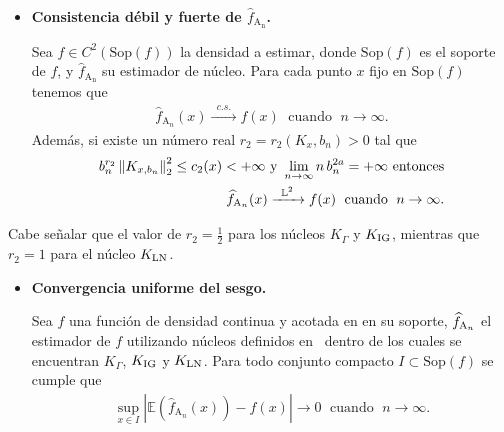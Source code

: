 \begin{itemize}
	\item \textbf{Consistencia débil y fuerte de $\widehat{f}_{\text{A}_\text{n}}$.} 
	\begin{theorem}
		Sea $f \in C^2(\mathrm{Sop}(f))$ la densidad a estimar, donde $\mathrm{Sop}(f)$ es el soporte de $f$, y $\widehat{f}_{\text{A}_\text{n}}$ su estimador de núcleo. Para cada punto $x$ fijo en $\mathrm{Sop}(f)$ tenemos que
		\begin{align}
		\widehat{f}_{\text{A}_n}(x) \xrightarrow{\;\; c.s. \;\; }f(x) \; \text{ cuando } \; n \rightarrow \infty.
		\label{Consistenciac.s.} 
		\end{align}	
		Además, si existe un número real $r_2=r_2(K_x,b_n)>0$ tal que 
		\begin{align}
		b_n^{r_2}\left\lVert K_{x,b_n}\right\rVert_2^2 \leq c_2(x)<+\infty \text{ y } \lim\limits_{n \rightarrow \infty} n \, b_n^{2a}=+\infty \text{ entonces}\\
		\centering \widehat{f}_{\text{A}_n}(x) \xrightarrow{\;\; \mathbb{L}^2 \;\; }f(x) \; \text{ cuando } \; n \rightarrow \infty.
		\label{ConsistenciaL2} 
		\end{align}	
\end{theorem}
\end{itemize}

Cabe señalar que el valor de $r_2=\frac{1}{2}$ para los núcleos $K_{\Gamma}$ y $K_{\tiny \text{IG}}$, mientras que $r_2=1$ para el núcleo $K_{\tiny \text{LN}}$.

\begin{itemize}
	\item \textbf{Convergencia uniforme del sesgo.} 
	\begin{theorem}
		Sea $f$ una función de densidad continua y acotada en en su soporte, $\widehat{f}_{\tiny \text{A}_n}$ el estimador de $f$ utilizando núcleos definidos en~\cite{Libnegue2013} dentro de los cuales se encuentran $K_{\Gamma}$, $K_{\tiny \text{IG}}$ y $K_{\tiny \text{LN}}$. Para todo conjunto compacto $I \subset \mathrm{Sop}(f)$ se cumple que
		\begin{align}
			\sup_{x \in I} |\mathbb{E}(\widehat{f}_{\text{A}_n}(x))-f(x)|\xrightarrow{\;\;  \;\; }0 \; \text{ cuando } \; n \rightarrow \infty.
			\label{convergenciaProb} 
		\end{align}
	\end{theorem}
\end{itemize}

